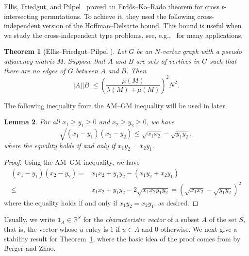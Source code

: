 \documentclass[10pt,a4paper]{amsart}
\numberwithin{equation}{section}
\newtheorem{theorem}{Theorem}[section]
\newtheorem{lemma}[theorem]{Lemma}
\def\RR{\mathbb{R}}
\def\1{\mathbf{1}}
\begin{document}



Ellis, Friedgut, and Pilpel~\cite{EllisJAMS}
proved an Erd\H{o}s--Ko--Rado theorem for cross $t$-intersecting permutations.
To achieve it, they used the following cross-independent version of the Hoffman--Delsarte bound. %
This bound is useful when we study the cross-independent type problems,
see, e.g.,~\cite{Tokushige} for many applications.




\begin{theorem}[Ellis--Friedgut--Pilpel \cite{EllisJAMS}]\label{CrossHDbound}
Let $G$ be an $N$-vertex graph with a pseudo adjacency matrix $M$.
Suppose that $A$ and $B$ are sets of vertices in $G$ such
that there are no edges of $G$ between $A$ and $B$.
Then
$$ |A||B| \leq \left(\frac{\mu (M)}{\lambda (M)+\mu (M)}\right)^2N^2.$$
\end{theorem}



The following inequality from the AM--GM inequality will be used in later.

\begin{lemma}\label{specialAGinq}
For all $x_1\geq y_1\geq 0$ and $x_2\geq y_2\geq 0$, we have
$$\sqrt{(x_1-y_1)(x_2-y_2)}\leq \sqrt{x_1x_2}-\sqrt{y_1y_2},$$
where the equality holds if and only if $x_1y_2=x_2y_1$.
\end{lemma}
\begin{proof}
Using the AM--GM inequality, we have
\begin{align*}
(x_1-y_1)(x_2-y_2)=&x_1x_2 +y_1y_2- (x_1y_2+x_2 y_1)\\
\leq &x_1x_2 +y_1y_2-2\sqrt{x_1x_2y_1y_2}
= (\sqrt{x_1x_2}-\sqrt{y_1y_2})^2
\end{align*}
where the equality holds if and only if $x_1y_2=x_2y_1$, as desired.
\end{proof}



Usually, we write $\1_A\in \RR^S$ for the {\em characteristic vector} of a subset $A$  of the set $S$, that is, the vector whose $u$-entry is $1$ if $u\in A$ and $0$ otherwise.
We next give a stability result for Theorem~\ref{CrossHDbound}, where the basic idea of the proof comes from \cite[Lemma 2.1]{Berger} by Berger and Zhao.
\end{document}
